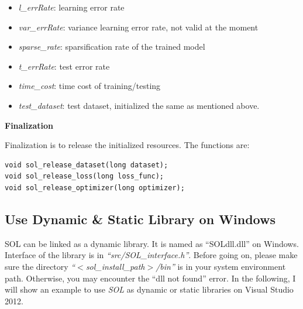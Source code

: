 \documentclass[11pt,a4paper]{article}
\newlength{\wideitemsep}
\let\olditem\item
\renewcommand{\item}{\setlength{\itemsep}{\wideitemsep}\olditem}
\begin{document}
\begin{itemize}
    \item \emph{l\_errRate}: learning error rate
    \item \emph{var\_errRate}: variance learning error rate, not valid at the
        moment
    \item \emph{sparse\_rate}: sparsification rate of the trained model
    \item \emph{t\_errRate}: test error rate
    \item \emph{time\_cost}: time cost of training/testing
    \item \emph{test\_dataset}: test dataset, initialized the same as mentioned
        above.
\end{itemize}

\vspace{4mm}\hspace{-5mm}\textbf{Finalization}
\vspace{2mm}

Finalization is to release the initialized resources. The functions are:
\lstset{language=C++}
\begin{lstlisting}
void sol_release_dataset(long dataset);
void sol_release_loss(long loss_func);
void sol_release_optimizer(long optimizer);
\end{lstlisting}

\subsection{Use Dynamic \& Static Library on Windows}
SOL can be linked as a dynamic library. It is named as ``SOLdll.dll'' on
Windows.  Interface of the library is in \emph{``src/SOL\_interface.h''}.
Before going on, please make sure the directory \emph{``$<$sol\_install\_path$>$/bin''} is in your system
environment path. Otherwise, you may encounter the ``dll not found'' error.
In the following, I will show an example to use \emph{SOL} as dynamic or static
libraries on Visual Studio 2012.
\end{document}
